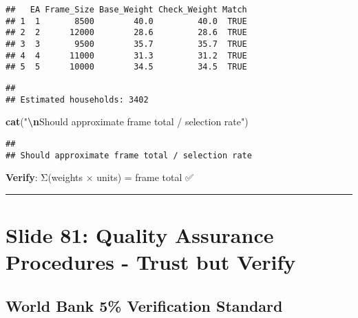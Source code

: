 \documentclass[
]{article}
\newenvironment{Shaded}{\begin{snugshade}}{\end{snugshade}}
\newcommand{\CommentTok}[1]{\textcolor[rgb]{0.56,0.35,0.01}{\textit{#1}}}
\newcommand{\DecValTok}[1]{\textcolor[rgb]{0.00,0.00,0.81}{#1}}
\newcommand{\FunctionTok}[1]{\textcolor[rgb]{0.13,0.29,0.53}{\textbf{#1}}}
\newcommand{\NormalTok}[1]{#1}
\newcommand{\OtherTok}[1]{\textcolor[rgb]{0.56,0.35,0.01}{#1}}
\newcommand{\SpecialCharTok}[1]{\textcolor[rgb]{0.81,0.36,0.00}{\textbf{#1}}}
\newcommand{\StringTok}[1]{\textcolor[rgb]{0.31,0.60,0.02}{#1}}
\begin{document}
\begin{verbatim}
##   EA Frame_Size Base_Weight Check_Weight Match
## 1  1       8500        40.0         40.0  TRUE
## 2  2      12000        28.6         28.6  TRUE
## 3  3       9500        35.7         35.7  TRUE
## 4  4      11000        31.3         31.2  TRUE
## 5  5      10000        34.5         34.5  TRUE
\end{verbatim}

\begin{Shaded}
\end{Shaded}

\begin{verbatim}
## 
## Estimated households: 3402
\end{verbatim}

\begin{Shaded}
\begin{Highlighting}[]
\FunctionTok{cat}\NormalTok{(}\StringTok{"}\SpecialCharTok{\textbackslash{}n}\StringTok{Should approximate frame total / selection rate"}\NormalTok{)}
\end{Highlighting}
\end{Shaded}

\begin{verbatim}
## 
## Should approximate frame total / selection rate
\end{verbatim}

\textbf{Verify}: Σ(weights × units) = frame total ✅

\begin{center}\rule{0.5\linewidth}{0.5pt}\end{center}

\section{Slide 81: Quality Assurance Procedures - Trust but
Verify}\label{slide-81-quality-assurance-procedures---trust-but-verify}

\subsection{World Bank 5\% Verification
Standard}\label{world-bank-5-verification-standard}
\end{document}
